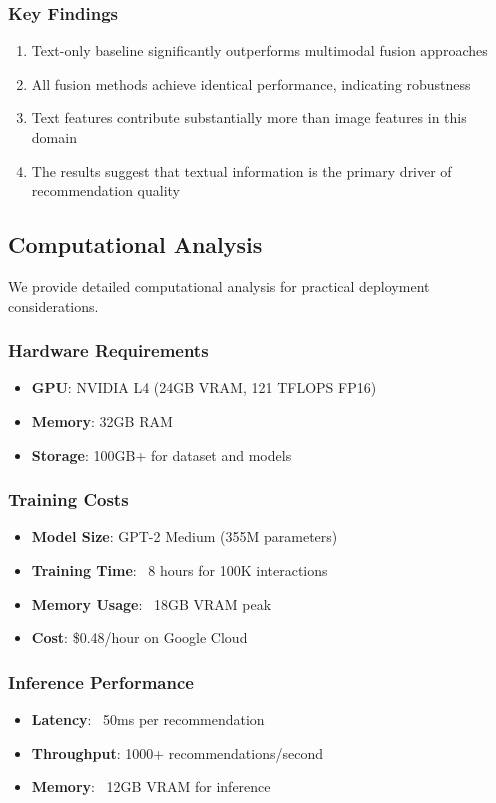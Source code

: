 \documentclass[conference]{IEEEtran}
\begin{document}
\subsubsection{Key Findings}
\begin{enumerate}
    \item Text-only baseline significantly outperforms multimodal fusion approaches
    \item All fusion methods achieve identical performance, indicating robustness
    \item Text features contribute substantially more than image features in this domain
    \item The results suggest that textual information is the primary driver of recommendation quality
\end{enumerate}

\subsection{Computational Analysis}
We provide detailed computational analysis for practical deployment considerations.

\subsubsection{Hardware Requirements}
\begin{itemize}
    \item \textbf{GPU}: NVIDIA L4 (24GB VRAM, 121 TFLOPS FP16)
    \item \textbf{Memory}: 32GB RAM
    \item \textbf{Storage}: 100GB+ for dataset and models
\end{itemize}

\subsubsection{Training Costs}
\begin{itemize}
    \item \textbf{Model Size}: GPT-2 Medium (355M parameters)
    \item \textbf{Training Time}: ~8 hours for 100K interactions
    \item \textbf{Memory Usage}: ~18GB VRAM peak
    \item \textbf{Cost}: \$0.48/hour on Google Cloud
\end{itemize}

\subsubsection{Inference Performance}
\begin{itemize}
    \item \textbf{Latency}: ~50ms per recommendation
    \item \textbf{Throughput}: 1000+ recommendations/second
    \item \textbf{Memory}: ~12GB VRAM for inference
\end{itemize}
\end{document}
